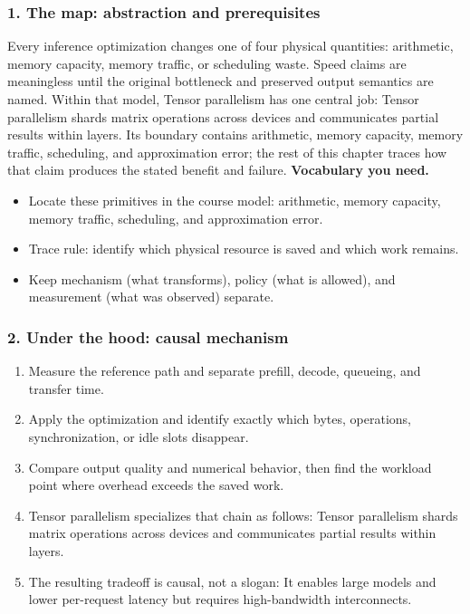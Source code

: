 \subsubsection*{1. The map: abstraction and prerequisites}
Every inference optimization changes one of four physical quantities: arithmetic, memory capacity, memory traffic, or scheduling waste. Speed claims are meaningless until the original bottleneck and preserved output semantics are named.
Within that model, Tensor parallelism has one central job: Tensor parallelism shards matrix operations across devices and communicates partial results within layers. Its boundary contains arithmetic, memory capacity, memory traffic, scheduling, and approximation error; the rest of this chapter traces how that claim produces the stated benefit and failure.
\textbf{Vocabulary you need.}\begin{itemize}
\item Locate these primitives in the course model: arithmetic, memory capacity, memory traffic, scheduling, and approximation error.
\item Trace rule: identify which physical resource is saved and which work remains.
\item Keep mechanism (what transforms), policy (what is allowed), and measurement (what was observed) separate.
\end{itemize}
\subsubsection*{2. Under the hood: causal mechanism}\begin{enumerate}
\item Measure the reference path and separate prefill, decode, queueing, and transfer time.
\item Apply the optimization and identify exactly which bytes, operations, synchronization, or idle slots disappear.
\item Compare output quality and numerical behavior, then find the workload point where overhead exceeds the saved work.
\item Tensor parallelism specializes that chain as follows: Tensor parallelism shards matrix operations across devices and communicates partial results within layers.
\item The resulting tradeoff is causal, not a slogan: It enables large models and lower per-request latency but requires high-bandwidth interconnects.
\end{enumerate}
